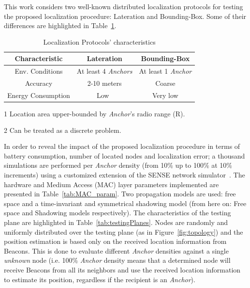 This work considers two well-known distributed localization protocols for testing the proposed localization procedure: Lateration and Bounding-Box. Some of their differences are highlighted in Table~\ref{table:protocols}.

\begin{table}[tb]
  \centering
  \begin{threeparttable}[t]
    \caption{Localization Protocols' characteristics}
    \label{table:protocols}
    \begin{tabular}{c||c||c}
    \hline
    \bfseries Characteristic & \bfseries Lateration & \bfseries Bounding-Box\\
    \hline\hline 
    Env. Conditions & At least 4 \emph{Anchors} & At least 1 \emph{Anchor}\\
    Accuracy & 2-10 meters & Coarse\tnote{1}\\
    Energy Consumption & Low~\cite{laterationSpecs} & Very low\tnote{2}\\
    \hline
    \end{tabular}
    \begin{tablenotes}
    \item [1] Location area upper-bounded by \emph{Anchor}'s radio range (R).
    \item [2] Can be treated as a discrete problem.
    \end{tablenotes}
  \end{threeparttable}
\end{table}

In order to reveal the impact of the proposed localization procedure in terms of battery consumption, number of located nodes and localization error; a thousand simulations are performed per \emph{Anchor} density (from 10\% up to 100\% at 10\% increments) using a customized extension of the SENSE network simulator~\cite{sense}. The hardware and Medium Access (MAC) layer parameters implemented are presented in Table~\ref{tab:MAC_param}. Two propagation models are used: free space and a time-invariant and symmetrical shadowing model (from here on: Free space and Shadowing models respectively). The characteristics of the testing plane are highlighted in Table~\ref{tab:testingPlanes}. Nodes are randomly and uniformly distributed over the testing plane (as in Figure~\ref{fig:topology}) and the position estimation is based only on the received location information from Beacons. This is done to evaluate different \emph{Anchor} densities against a single \emph{unknown} node (i.e. 100\% \emph{Anchor} density means 
that a determined node will receive Beacons from all its neighbors and use the received location information to estimate its position, regardless if the recipient is an \emph{Anchor}).


